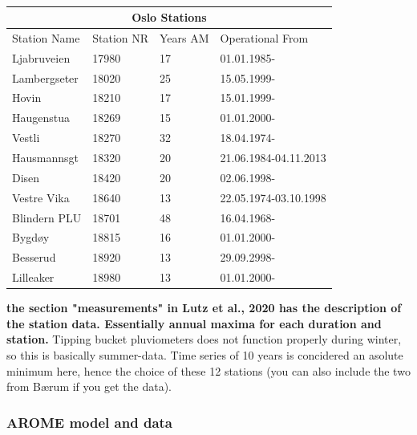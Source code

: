 \\

\begin{center}
\begin{tabular}{ |p{3cm}||p{3cm}|p{3cm}|p{3cm}|  }
\hline
\multicolumn{4}{|c|}{Oslo Stations} \\
\hline
 Station Name & Station NR & Years AM & Operational From\\
 Ljabruveien & 17980  & 17 &  01.01.1985-\\
 Lambergseter & 18020 & 25 & 15.05.1999-\\
 Hovin & 18210 & 17 & 15.01.1999-\\
 Haugenstua & 18269 & 15 & 01.01.2000-\\
 Vestli & 18270 & 32 & 18.04.1974-\\
 Hausmannsgt & 18320 & 20 & 21.06.1984-04.11.2013\\
 Disen & 18420 & 20 & 02.06.1998-\\
 Vestre Vika & 18640 & 13 & 22.05.1974-03.10.1998\\
 Blindern PLU & 18701 & 48 & 16.04.1968-\\
 Bygdøy & 18815 & 16 & 01.01.2000-\\
 Besserud & 18920 & 13 & 29.09.2998-\\
 Lilleaker & 18980 & 13 & 01.01.2000-   
\end{tabular}
\end{center}

\textbf{the section "measurements" in Lutz et al., 2020 has the description of the station data. Essentially annual maxima for each duration and station.} Tipping bucket pluviometers does not function properly during winter, so this is basically summer-data. Time series of 10 years is concidered an asolute minimum here, hence the choice of these 12 stations (you can also include the two from Bærum if you get the data). 

\subsubsection{AROME model and data}

